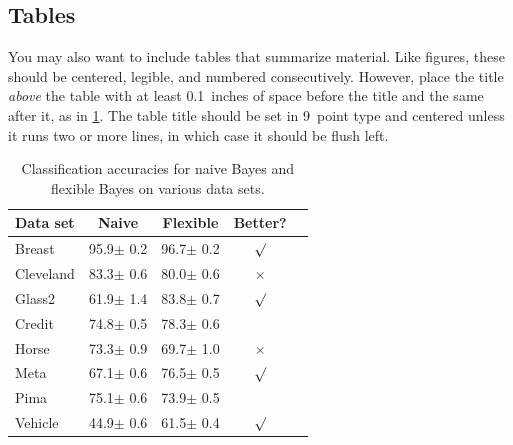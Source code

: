 \documentclass{article}
\theoremstyle{plain}
\theoremstyle{definition}
\theoremstyle{remark}
\begin{document}
\subsection{Tables}

You may also want to include tables that summarize material. Like figures,
these should be centered, legible, and numbered consecutively. However, place
the title \emph{above} the table with at least 0.1~inches of space before the
title and the same after it, as in \cref{sample-table}. The table title should
be set in 9~point type and centered unless it runs two or more lines, in which
case it should be flush left.


\begin{table}[t]
  \caption{Classification accuracies for naive Bayes and flexible
    Bayes on various data sets.}
  \label{sample-table}
  \begin{center}
    \begin{small}
      \begin{sc}
        \begin{tabular}{lcccr}
          \toprule
          Data set  & Naive         & Flexible      & Better?  \\
          \midrule
          Breast    & 95.9$\pm$ 0.2 & 96.7$\pm$ 0.2 & $\surd$  \\
          Cleveland & 83.3$\pm$ 0.6 & 80.0$\pm$ 0.6 & $\times$ \\
          Glass2    & 61.9$\pm$ 1.4 & 83.8$\pm$ 0.7 & $\surd$  \\
          Credit    & 74.8$\pm$ 0.5 & 78.3$\pm$ 0.6 &          \\
          Horse     & 73.3$\pm$ 0.9 & 69.7$\pm$ 1.0 & $\times$ \\
          Meta      & 67.1$\pm$ 0.6 & 76.5$\pm$ 0.5 & $\surd$  \\
          Pima      & 75.1$\pm$ 0.6 & 73.9$\pm$ 0.5 &          \\
          Vehicle   & 44.9$\pm$ 0.6 & 61.5$\pm$ 0.4 & $\surd$  \\
          \bottomrule
        \end{tabular}
      \end{sc}
    \end{small}
  \end{center}
  \vskip -0.1in
\end{table}
\end{document}
